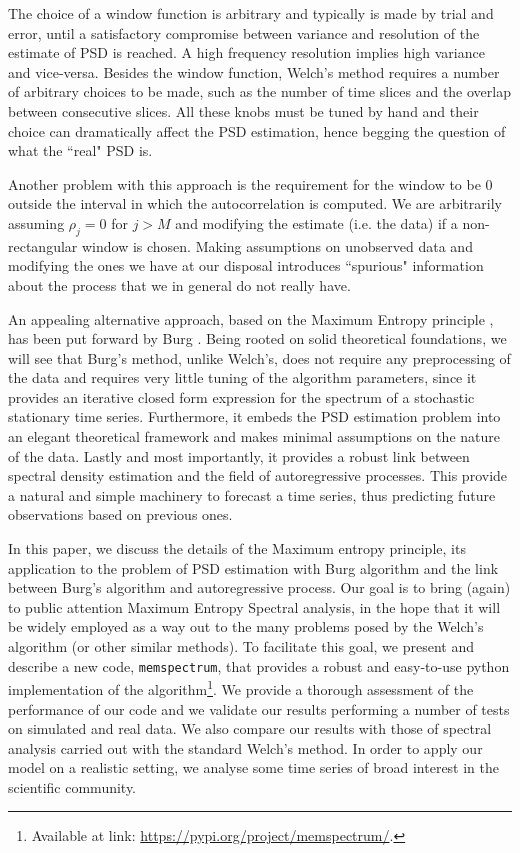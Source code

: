 \documentclass[twocolumn,showpacs,preprintnumbers,nofootinbib,prd,
superscriptaddress,10pt]{revtex4-1}
\begin{document}
The choice of a window function is arbitrary and typically is made by trial and error, until a satisfactory compromise between variance and resolution of the estimate of PSD is reached. A high frequency resolution implies high variance and vice-versa.
Besides the window function, Welch's method requires a number of arbitrary choices to be made, such as the number of time slices and the overlap between consecutive slices. All these knobs must be tuned by hand and their choice can dramatically affect the PSD estimation, hence begging the question of what the ``real" PSD is.

Another problem with this approach is the requirement for the window to be $0$ outside the interval in which the autocorrelation is computed.
We are arbitrarily assuming $\rho_j = 0$ for $j > M$ and modifying the estimate (i.e. the data) if a non-rectangular window is chosen.
Making assumptions on unobserved data and modifying the ones we have at our disposal introduces ``spurious" information about the process that we in general do not really have.

An appealing alternative approach, based on the Maximum Entropy principle \cite{JaynesArticle,jaynes2003ptl, Jaynes_MAXENT}, has been put forward by Burg \cite{burg1975maximum}. Being rooted on solid theoretical foundations, we will see that Burg's method, unlike Welch's, does not require any preprocessing of the data and requires very little tuning of the algorithm parameters, since it provides an iterative closed form expression for the spectrum of a stochastic stationary time series. Furthermore, it embeds the PSD estimation problem into an elegant theoretical framework and makes minimal assumptions on the nature of the data.
Lastly and most importantly, it provides a robust link between spectral density estimation and the field of autoregressive processes. This provide a natural and simple machinery to forecast a time series, thus predicting future observations based on previous ones.

In this paper, we discuss the details of the Maximum entropy principle, its application to the problem of PSD estimation with Burg algorithm and the link between Burg's algorithm and autoregressive process.
Our goal is to bring (again) to public attention Maximum Entropy Spectral analysis, in the hope that it will be widely employed as a way out to the many problems posed by the Welch's algorithm (or other similar methods).
To facilitate this goal, we present and describe a new code, \texttt{memspectrum}, that provides a robust and easy-to-use python implementation of the algorithm\footnote{
Available at link: \url{https://pypi.org/project/memspectrum/}.
}.
We provide a thorough assessment of the performance of our code and we validate our results performing a number of tests on simulated and real data.
We also compare our results with those of spectral analysis carried out with the standard Welch's method.
In order to apply our model on a realistic setting, we analyse some time series of broad interest in the scientific community.
\end{document}
